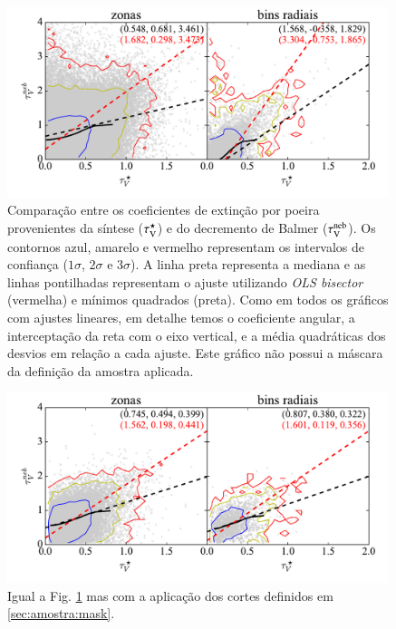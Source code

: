 \begin{figure}
	\centering
	\includegraphics[width=0.99\textwidth]{figuras/CompareTauV.pdf}
	\caption[Comparação entre os coeficientes de extinção.] 
	{Comparação entre os coeficientes de extinção por poeira provenientes da síntese ($\tau_{\mathrm{V}}^\star$) e
do decremento de Balmer ($\tau_{\mathrm{V}}^{\mathrm{neb}}$). Os contornos azul, amarelo e vermelho representam os
intervalos de confiança ($1\sigma$, $2\sigma$ e $3\sigma$). A linha preta representa a mediana e as linhas
pontilhadas representam o ajuste utilizando {\em OLS bisector} (vermelha) e mínimos quadrados
(preta). Como em todos os gráficos com ajustes lineares, em detalhe temos o coeficiente angular, a
interceptação da reta com o eixo vertical, e a média quadráticas dos desvios em relação a cada
ajuste. Este gráfico não possui a máscara da definição da amostra aplicada.}
	\label{fig:tauVsynvsneb}
\end{figure}

\begin{figure}
	\centering
	\includegraphics[width=0.99\textwidth]{figuras/CompareTauV_realsample.pdf}
	\caption[Comparação entre os coeficientes de extinção da amostra selecionada.]
	{Igual a Fig. \ref{fig:tauVsynvsneb} mas com a aplicação dos cortes definidos em
\ref{sec:amostra:mask}.} 
	\label{fig:tauVsynvsnebMask}
\end{figure}


